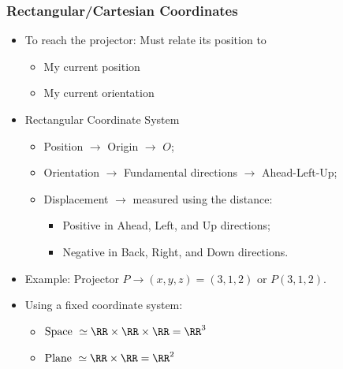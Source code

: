 \begin{frame}
\frametitle{Rectangular/Cartesian Coordinates}

\begin{itemize}
\item To reach the projector: \pause Must relate its position to
\begin{itemize}
\item My current position
\item My current orientation
\end{itemize}

\item<3-> Rectangular Coordinate System
\begin{itemize}
\item Position $\to$ Origin $\to$ $O$;
\item Orientation $\to$ Fundamental directions $\to$ Ahead-Left-Up;
\item Displacement $\to$ measured using the distance:
\begin{itemize}
\item Positive in Ahead, Left, and Up directions;
\item Negative in Back, Right, and Down directions.
\end{itemize}
\end{itemize}

\item<4-> Example: Projector $P \to (x,y,z) = (3,1,2)$ or $P(3,1,2)$.

\item<5-> Using a fixed coordinate system:
\begin{itemize}
\item $\text{Space } \simeq \RR \times \RR \times \RR = \RR^3$
\item $\text{Plane } \simeq \RR \times \RR = \RR^2$
\end{itemize}
\end{itemize}
\end{frame}

